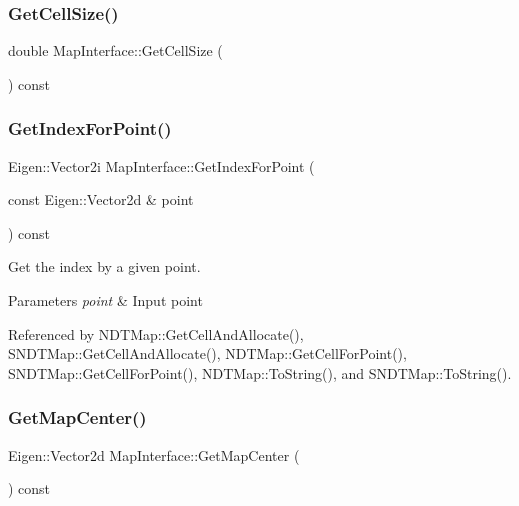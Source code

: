 \subsubsection{\texorpdfstring{Get\+Cell\+Size()}{GetCellSize()}}
{\footnotesize\ttfamily double Map\+Interface\+::\+Get\+Cell\+Size (\begin{DoxyParamCaption}{ }\end{DoxyParamCaption}) const\hspace{0.3cm}{\ttfamily [inline]}}

\mbox{\label{classMapInterface_abda1b7e35d6af9e42ca698c909ba976b}} 
\subsubsection{\texorpdfstring{Get\+Index\+For\+Point()}{GetIndexForPoint()}}
{\footnotesize\ttfamily Eigen\+::\+Vector2i Map\+Interface\+::\+Get\+Index\+For\+Point (\begin{DoxyParamCaption}\item[{const Eigen\+::\+Vector2d \&}]{point }\end{DoxyParamCaption}) const\hspace{0.3cm}{\ttfamily [inline]}}



Get the index by a given point. 


\begin{DoxyParams}{Parameters}
{\em point} & Input point \\
\hline
\end{DoxyParams}


Referenced by N\+D\+T\+Map\+::\+Get\+Cell\+And\+Allocate(), S\+N\+D\+T\+Map\+::\+Get\+Cell\+And\+Allocate(), N\+D\+T\+Map\+::\+Get\+Cell\+For\+Point(), S\+N\+D\+T\+Map\+::\+Get\+Cell\+For\+Point(), N\+D\+T\+Map\+::\+To\+String(), and S\+N\+D\+T\+Map\+::\+To\+String().

\mbox{\label{classMapInterface_ad2ab3f050d776762ff6a3b9d7a6a1bc6}} 
\subsubsection{\texorpdfstring{Get\+Map\+Center()}{GetMapCenter()}}
{\footnotesize\ttfamily Eigen\+::\+Vector2d Map\+Interface\+::\+Get\+Map\+Center (\begin{DoxyParamCaption}{ }\end{DoxyParamCaption}) const\hspace{0.3cm}{\ttfamily [inline]}}

